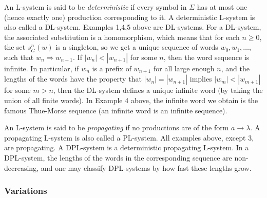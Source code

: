 \documentclass[12pt]{article}
\begin{document}
An L-system is said to be \emph{deterministic} if every symbol in $\Sigma$ has at most one (hence exactly one) production corresponding to it.  A deterministic L-system is also called a DL-system.  Examples 1,4,5 above are DL-systems.  For a DL-system, the associated substitution is a homomorphism, which means that for each $n\ge 0$, the set $s_G^n(w)$ is a singleton, so we get a unique sequence of words $w_0, w_1, \ldots$, such that $w_n\Rightarrow w_{n+1}$.  If $|w_n|<|w_{n+1}|$ for some $n$, then the word sequence is infinite.  In particular, if $w_n$ is a prefix of $w_{n+1}$ for all large enough $n$, and the lengths of the words have the property that $|w_n|=|w_{n+1}|$ implies $|w_m|<|w_{m+1}|$ for some $m>n$, then the DL-system defines a unique infinite word (by taking the union of all finite words).  In Example 4 above, the infinite word we obtain is the famous Thue-Morse sequence (an infinite word is an infinite sequence).

An L-system is said to be \emph{propagating} if no productions are of the form $a\to \lambda$. A propagating L-system is also called a PL-system.  All examples above, except 3, are propagating.  A DPL-system is a deterministic propagating L-system.  In a DPL-system, the lengths of the words in the corresponding sequence are non-decreasing, and one may classify DPL-systems by how fast these lengths grow.

\subsubsection*{Variations}
\end{document}
